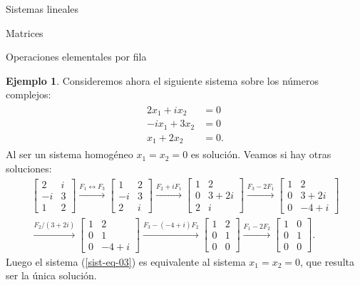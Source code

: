 \documentclass[a4paper,12pt,twoside,spanish]{amsbook}
\theoremstyle{definition}
\newtheorem{ejemplo}{Ejemplo}[section]
\theoremstyle{remark}
\begin{document}
\begin{chapter}{Sistemas lineales}
\begin{section}{Matrices}
\begin{subsection}{Operaciones elementales por fila}
				
				\begin{ejemplo}
					Consideremos ahora el siguiente sistema sobre los números complejos:
					\begin{align}\label{sist-eq-03}
					\begin{split}
					2x_1 +i x_2 &= 0 \\
					-ix_1 +3x_2  &=0 \\
					x_1 +2x_2  &= 0.
					\end{split}
					\end{align}
					Al ser un sistema homogéneo $x_1=x_2 = 0$ es solución. Veamos si hay otras soluciones: 
					\begin{multline*}
					\begin{bmatrix} 2&i \\ -i&3 \\ 1&2 \end{bmatrix}
					\stackrel{F_1\leftrightarrow F_3}{\longrightarrow} 
					\begin{bmatrix} 1&2 \\ -i&3 \\ 2&i \end{bmatrix}
					\stackrel{F_2+iF_1}{\longrightarrow} 
					\begin{bmatrix} 1&2 \\ 0&3+2i \\ 2&i \end{bmatrix}
					\stackrel{F_3-2F_1}{\longrightarrow} 
					\begin{bmatrix} 1&2 \\ 0&3+2i \\ 0&-4+i \end{bmatrix}
					\\
					\stackrel{F_2/(3+2i)}{\longrightarrow} 
					\begin{bmatrix} 1&2 \\ 0&1 \\ 0&-4+i \end{bmatrix}
					\stackrel{F_3-(-4+i)F_2}{\longrightarrow} 
					\begin{bmatrix} 1&2 \\ 0&1 \\ 0&0 \end{bmatrix}
					\stackrel{F_1-2F_2}{\longrightarrow} 
					\begin{bmatrix} 1&0 \\ 0&1 \\ 0&0 \end{bmatrix}.
					\end{multline*}
					Luego  el sistema (\ref{sist-eq-03}) es equivalente al sistema  $x_1=x_2 = 0$, que resulta ser la única solución.
				\end{ejemplo}
			\end{subsection} 
		\end{section}
	

\end{chapter}
\end{document}
